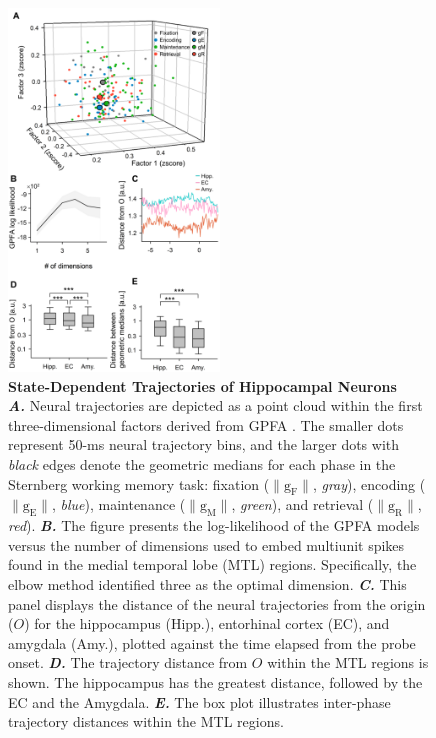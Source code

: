 \documentclass[final,3p,times,twocolumn]{elsarticle}
\begin{document}
        \clearpage
        \begin{figure}[ht]
        	\centering
            \includegraphics[width=0.5\textwidth]{./src/figures/.png/Figure_ID_02.png}
        	\caption{\textbf{
State-Dependent Trajectories of Hippocampal Neurons
}
\smallskip
\\
\textbf{\textit{A.}} Neural trajectories are depicted as a point cloud within the first three-dimensional factors derived from GPFA \cite{yu_gaussian-process_2009}. The smaller dots represent 50-ms neural trajectory bins, and the larger dots with \textit{black} edges denote the geometric medians for each phase in the Sternberg working memory task: fixation ($\mathrm{\lVert g_{F} \rVert}$, \textit{gray}), encoding ($\mathrm{\lVert g_{E} \rVert}$, \textit{blue}), maintenance ($\mathrm{\lVert g_{M} \rVert}$, \textit{green}), and retrieval ($\mathrm{\lVert g_{R} \rVert}$, \textit{red}). \textbf{\textit{B.}} The figure presents the log-likelihood of the GPFA models versus the number of dimensions used to embed multiunit spikes found in the medial temporal lobe (MTL) regions. Specifically, the elbow method identified three as the optimal dimension. \textbf{\textit{C.}} This panel displays the distance of the neural trajectories from the origin ($O$) for the hippocampus (Hipp.), entorhinal cortex (EC), and amygdala (Amy.), plotted against the time elapsed from the probe onset. \textbf{\textit{D.}} The trajectory distance from $O$ within the MTL regions is shown. The hippocampus has the greatest distance, followed by the EC and the Amygdala. \textbf{\textit{E.}} The box plot illustrates inter-phase trajectory distances within the MTL regions.
}
        	\label{fig:02}
        \end{figure}
\end{document}
